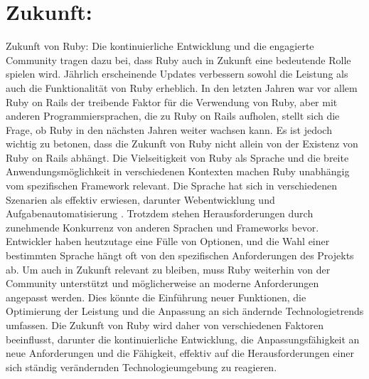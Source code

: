 \documentclass{article}
\begin{document}
\section*{Zukunft:}Zukunft von Ruby: 
Die kontinuierliche Entwicklung und die engagierte Community tragen dazu bei, dass Ruby auch in Zukunft eine bedeutende Rolle spielen wird. Jährlich erscheinende Updates verbessern sowohl die Leistung als auch die Funktionalität von Ruby erheblich.
In den letzten Jahren war vor allem Ruby on Rails der treibende Faktor für die Verwendung von Ruby, aber mit anderen Programmiersprachen, die zu Ruby on Rails aufholen, stellt sich die Frage, ob Ruby in den nächsten Jahren weiter wachsen kann. Es ist jedoch wichtig zu betonen, dass die Zukunft von Ruby nicht allein von der Existenz von Ruby on Rails abhängt.
Die Vielseitigkeit von Ruby als Sprache und die breite Anwendungsmöglichkeit in verschiedenen Kontexten machen Ruby unabhängig vom spezifischen Framework relevant. Die Sprache hat sich in verschiedenen Szenarien als effektiv erwiesen, darunter Webentwicklung und Aufgabenautomatisierung .
Trotzdem stehen Herausforderungen durch zunehmende Konkurrenz von anderen Sprachen und Frameworks bevor. Entwickler haben heutzutage eine Fülle von Optionen, und die Wahl einer bestimmten Sprache hängt oft von den spezifischen Anforderungen des Projekts ab.
Um auch in Zukunft relevant zu bleiben, muss Ruby weiterhin von der Community unterstützt und möglicherweise an moderne Anforderungen angepasst werden. Dies könnte die Einführung neuer Funktionen, die Optimierung der Leistung und die Anpassung an sich ändernde Technologietrends umfassen.
Die Zukunft von Ruby wird daher von verschiedenen Faktoren beeinflusst, darunter die kontinuierliche Entwicklung, die Anpassungsfähigkeit an neue Anforderungen und die Fähigkeit, effektiv auf die Herausforderungen einer sich ständig verändernden Technologieumgebung zu reagieren.
\end{document}
